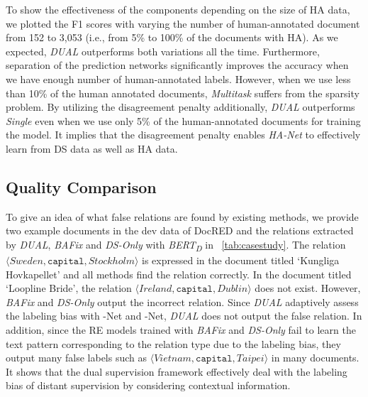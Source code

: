 \documentclass[11pt]{article}
\newcommand{\triple}[3]{\ensuremath{\langle #1,#2,#3\rangle}}
\newcommand{\hanet}{\emph{HA-Net}\xspace}
\newcommand{\munet}{-Net\xspace}
\newcommand{\sigmanet}{-Net\xspace}
\newcommand{\relationt}[1]{\texttt{#1}}
\newcommand{\dbert}{\emph{BERT\textsubscript{D}}\xspace}
\newcommand{\dual}{\emph{DUAL}\xspace}
\newcommand{\bafix}{\emph{BAFix}\xspace}
\newcommand{\dsonly}{\emph{DS-Only}\xspace}
\newcommand{\multitask}{\emph{Multitask}\xspace}
\newcommand{\single}{\emph{Single}\xspace}
\begin{document}
To show the effectiveness of the components depending on the size of HA data, we plotted the F1 scores with varying the number of human-annotated document from 152 to 3,053 (i.e., from 5\% to 100\% of the documents with HA).
As we expected, \dual outperforms both variations all the time.
Furthermore, separation of the prediction networks significantly improves the accuracy when we have enough number of human-annotated labels.
However, when we use less than 10\% of the human annotated documents, \multitask suffers from the sparsity problem.
By utilizing the disagreement penalty additionally, \dual outperforms \single even when we use only 5\% of the human-annotated documents for training the model.
It implies that the disagreement penalty enables \hanet to effectively learn from DS data as well as HA data.














\subsection{Quality Comparison}
To give an idea of what false relations are found by existing methods,
we provide two example documents in the dev data of DocRED and the relations extracted by \dual, \bafix and \dsonly with \dbert in \tablename~\ref{tab:casestudy}.
The relation \triple{Sweden}{\relationt{capital}}{Stockholm} is expressed in the document titled `Kungliga Hovkapellet' and
all methods find the relation correctly.
In the document titled `Loopline Bride', the relation \triple{Ireland}{\relationt{capital}}{Dublin} does not exist.
However, \bafix and \dsonly output the incorrect relation.
Since \dual adaptively assess the labeling bias with \munet and \sigmanet, \dual does not output the false relation.
In addition, since the RE models trained with \bafix and \dsonly fail to learn the text pattern corresponding to the relation type due to the labeling bias, they output many false labels such as \triple{Vietnam}{\relationt{capital}}{Taipei} in many documents.
It shows that the dual supervision framework effectively deal with the labeling bias of distant supervision by considering contextual information.
\end{document}
